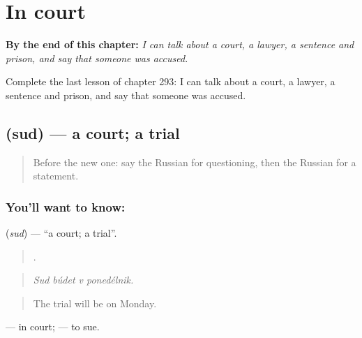 
\chapter{In court}
\label{ch:ru-in-court}

\begin{chapteropening}
\textbf{By the end of this chapter:} \emph{I can talk about a court, a lawyer, a sentence and prison, and say that someone was accused.}

Complete the last lesson of chapter 293: I can talk about a court, a lawyer, a sentence and prison, and say that someone was accused.
\end{chapteropening}

\section[\texorpdfstring{\ru{суд} (sud)}{суд (sud)}]{ (sud) — a court; a trial}

\label{lesson:RU-C293-sud}



\begin{quote}
Before the new one: say the Russian for questioning, then the Russian for a statement.
\end{quote}

\subsection*{You'll want to know: }
\textbf{} (\emph{sud}) — \textquotedblleft{}a court; a trial\textquotedblright{}.

\begin{quote}
   .
\end{quote}

\begin{quote}
\emph{Sud búdet v ponedélnik.}
\end{quote}

\begin{quote}
The trial will be on Monday.
\end{quote}

\emph{ } — in court; \emph{  } — to sue.

